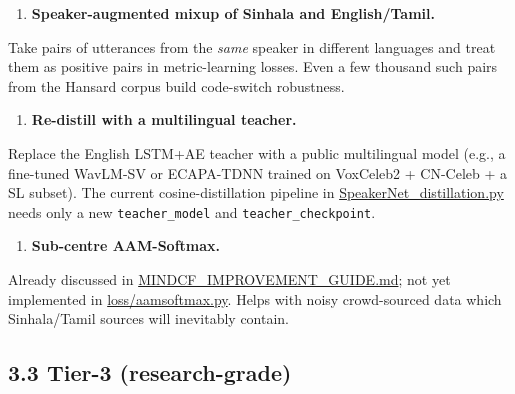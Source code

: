 \documentclass[10pt,a4paper]{article}
\begin{document}
\begin{enumerate}[leftmargin=*,itemsep=2pt]
  \item \textbf{Speaker-augmented mixup of Sinhala and English/Tamil.}
\end{enumerate}
Take pairs of utterances from the \textit{same} speaker in different languages and treat them as positive pairs in metric-learning losses. Even a few thousand such pairs from the Hansard corpus build code-switch robustness.

\begin{enumerate}[leftmargin=*,itemsep=2pt]
  \item \textbf{Re-distill with a multilingual teacher.}
\end{enumerate}
Replace the English LSTM+AE teacher with a public multilingual model (e.g., a fine-tuned WavLM-SV or ECAPA-TDNN trained on VoxCeleb2 + CN-Celeb + a SL subset). The current cosine-distillation pipeline in \href{voxceleb_trainer/SpeakerNet_distillation.py}{SpeakerNet\_distillation.py} needs only a new \texttt{teacher\_model} and \texttt{teacher\_checkpoint}.

\begin{enumerate}[leftmargin=*,itemsep=2pt]
  \item \textbf{Sub-centre AAM-Softmax.}
\end{enumerate}
Already discussed in \href{voxceleb_trainer/MINDCF_IMPROVEMENT_GUIDE.md}{MINDCF\_IMPROVEMENT\_GUIDE.md}; not yet implemented in \href{voxceleb_trainer/loss/aamsoftmax.py}{loss/aamsoftmax.py}. Helps with noisy crowd-sourced data which Sinhala/Tamil sources will inevitably contain.

\subsection*{3.3 Tier-3 (research-grade)}
\end{document}
